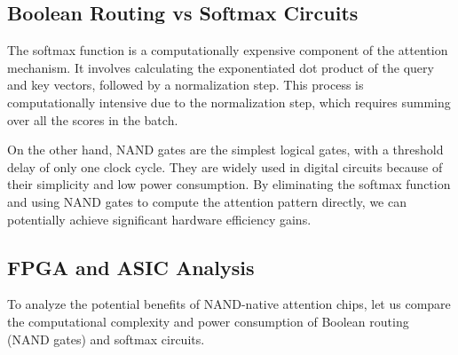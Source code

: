\subsection{Boolean Routing vs Softmax Circuits}













The softmax function is a computationally expensive component of the attention mechanism. It involves calculating the exponentiated dot product of the query and key vectors, followed by a normalization step. This process is computationally intensive due to the normalization step, which requires summing over all the scores in the batch.













On the other hand, NAND gates are the simplest logical gates, with a threshold delay of only one clock cycle. They are widely used in digital circuits because of their simplicity and low power consumption. By eliminating the softmax function and using NAND gates to compute the attention pattern directly, we can potentially achieve significant hardware efficiency gains.













\subsection{FPGA and ASIC Analysis}













To analyze the potential benefits of NAND-native attention chips, let us compare the computational complexity and power consumption of Boolean routing (NAND gates) and softmax circuits.














